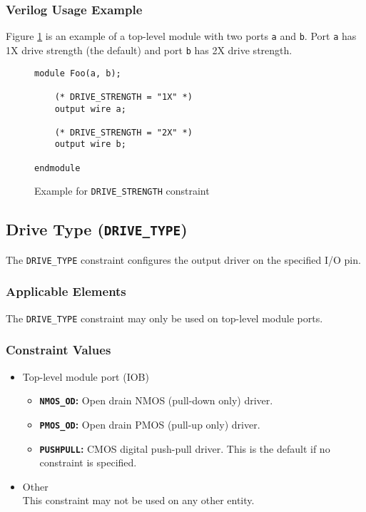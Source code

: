 \documentclass[11pt]{article}
\newcommand{\tokenstyle}[1]{\texttt{#1}}
\newcommand{\wirestyle}[1]{\texttt{#1}}
\newcommand{\valuestyle}[1]{\texttt{#1}}
\newcommand{\strvaluestyle}[1]{\valuestyle{\textquotedbl#1\textquotedbl}}
\newcommand{\strexamplestyle}[1]{\textbf{\strvaluestyle{#1}:}}
\newcommand{\whenstyle}[1]{{\fontseries{sb}\selectfont#1}}
\begin{document}
\subsubsection{Verilog Usage Example}

Figure \ref{constraint-drivestrength} is an example of a top-level module with two ports \wirestyle{a} and \wirestyle{b}. Port \wirestyle{a} has 1X drive strength (the default) and port \wirestyle{b} has 2X drive strength.

\begin{figure}[h]
\begin{lstlisting}
module Foo(a, b);

	(* DRIVE_STRENGTH = "1X" *)
	output wire a;

	(* DRIVE_STRENGTH = "2X" *)
	output wire b;

endmodule
\end{lstlisting}
\caption{Example for \tokenstyle{DRIVE\_STRENGTH} constraint}
\label{constraint-drivestrength}
\end{figure}


\pagebreak
\subsection{Drive Type (\tokenstyle{DRIVE\_TYPE})}

The \tokenstyle{DRIVE\_TYPE} constraint configures the output driver on the specified I/O pin.

\subsubsection{Applicable Elements}
The \tokenstyle{DRIVE\_TYPE} constraint may only be used on top-level module ports.

\subsubsection{Constraint Values}
\begin{itemize}
\item \whenstyle{Top-level module port (IOB)}
	\begin{itemize}
		\item \strexamplestyle{NMOS\_OD} Open drain NMOS (pull-down only) driver.
		\item \strexamplestyle{PMOS\_OD} Open drain PMOS (pull-up only) driver.
		\item \strexamplestyle{PUSHPULL} CMOS digital push-pull driver. This is the default if no constraint is specified.
	\end{itemize}
\item \whenstyle{Other} \\
This constraint may not be used on any other entity.
\end{itemize}
\end{document}
